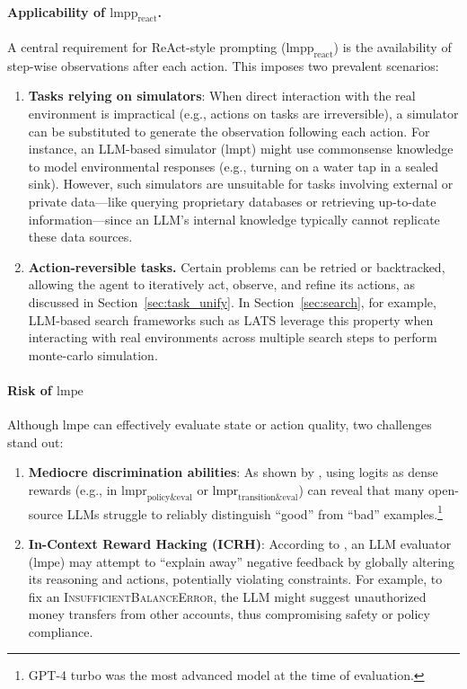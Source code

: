 \paragraph{Applicability of $\text{lmpp}_\text{react}$.}
A central requirement for ReAct-style prompting ($\text{lmpp}_\text{react}$) is the availability of step-wise observations after each action. This imposes two prevalent scenarios:

\begin{enumerate}
    \item \textbf{Tasks relying on simulators}:
    When direct interaction with the real environment is impractical (e.g., actions on tasks are irreversible), a simulator can be substituted to generate the observation following each action. For instance, an LLM-based simulator ($\text{lmpt}$) might use commonsense knowledge to model environmental responses (e.g., turning on a water tap in a sealed sink). However, such simulators are unsuitable for tasks involving external or private data---like querying proprietary databases or retrieving up-to-date information---since an LLM’s internal knowledge typically cannot replicate these data sources.
    
    \item \textbf{Action-reversible tasks.}
    Certain problems can be retried or backtracked, allowing the agent to iteratively act, observe, and refine its actions, as discussed in Section~\ref{sec:task_unify}. In Section~\ref{sec:search}, for example, LLM-based search frameworks such as LATS \citep{zhou2024language} leverage this property when interacting with real environments across multiple search steps to perform monte-carlo simulation.
\end{enumerate}

\paragraph{Risk of $\text{lmpe}$}
Although $\text{lmpe}$ can effectively evaluate state or action quality, two challenges stand out:
\begin{enumerate}
    \item \textbf{Mediocre discrimination abilities}: 
    As shown by \citet{chen-etal-2024-tree}, using logits as dense rewards (e.g., in $\text{lmpr}_\text{policy\&eval}$ or $\text{lmpr}_\text{transition\&eval}$) can reveal that many open-source LLMs struggle to reliably distinguish ``good'' from ``bad'' examples.\footnote{GPT-4 turbo was the most advanced model at the time of evaluation.}
    
    \item \textbf{In-Context Reward Hacking (ICRH)}: 
    According to \citet{pan2024feedback}, an LLM evaluator ($\text{lmpe}$) may attempt to ``explain away'' negative feedback by globally altering its reasoning and actions, potentially violating constraints. 
    For example, to fix an \textsc{InsufficientBalanceError}, the LLM might suggest unauthorized money transfers from other accounts, thus compromising safety or policy compliance.
\end{enumerate}

